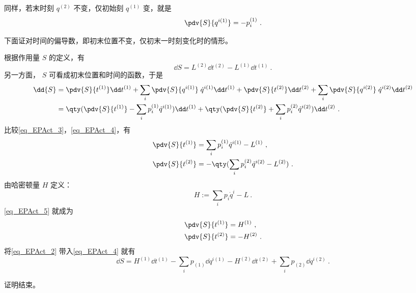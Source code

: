 同样，若末时刻 $q^{(2)}$ 不变，仅初始刻 $q^{(1)}$ 变，就是
\begin{equation}
\pdv{S}{{q}^{i (1)}}=-p_i^{(1)}~.
\end{equation}

下面证对时间的偏导数，即初末位置不变，仅初末一时刻变化时的情形。

根据作用量 $S$ 的定义，有
\begin{equation}\label{eq_EPAct_3}
\dd{S}=L^{(2)}\dd t^{(2)}-L^{(1)}\dd t^{(1)}~.
\end{equation}
另一方面， $S$ 可看成初末位置和时间的函数，于是
\begin{equation}\label{eq_EPAct_4}
\begin{aligned}
\dd{S}&=\pdv{S}{t^{(1)}}\dd t^{(1)}+\sum_i\pdv{S}{{q}^{i (1)}}\;{\dot q}^{i (1)}\dd t^{(1)}+\pdv{S}{t^{(2)}}\dd t^{(2)}+\sum_i\pdv{S}{{q}^{i (2)}}\; {\dot q}^{i (2)}\dd t^{(2)} \\
&=\qty(\pdv{S}{t^{(1)}}-\sum_i p_i^{(1)} {\dot q}^{i (1)})\dd t^{(1)}+\qty(\pdv{S}{t^{(2)}}+\sum_i p_i^{(2)}{\dot q}^{i (2)})\dd t^{(2)}~.
\end{aligned}
\end{equation}
比较\autoref{eq_EPAct_3}，\autoref{eq_EPAct_4}，有
\begin{equation}\label{eq_EPAct_5}
\begin{aligned}
\pdv{S}{t^{(1)}}&=\sum_i p_i^{(1)}{\dot q}^{i (1)}-L^{(1)}~,\\
\pdv{S}{t^{(2)}}&=-\qty(\sum_i p_i^{(2)}{\dot q}^{i (2)}-L^{(2)})~.
\end{aligned}
\end{equation}
由哈密顿量 $H$ 定义：
\begin{equation}
H:=\sum_i p_i {\dot q^i}-L~.
\end{equation}
\autoref{eq_EPAct_5} 就成为
\begin{equation}\label{eq_EPAct_2}
\begin{aligned}
\pdv{S}{t^{(1)}}&=H^{(1)}~,\\
\pdv{S}{t^{(2)}}&=-H^{(2)}~.
\end{aligned}
\end{equation}
将\autoref{eq_EPAct_2} 带入\autoref{eq_EPAct_4} 就有
\begin{equation}
\dd{S}=H^{(1)}\dd t^{(1)}-\sum_ip_{(1)}\dd {q}^{i (1)}-H^{(2)}\dd t^{(2)}+\sum_i p_{(2)}\dd {q}^{i (2)}~.
\end{equation}

证明结束。
